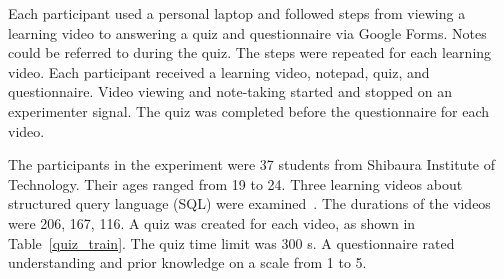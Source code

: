 %
Each participant used a personal laptop and followed steps from viewing a learning video to answering a quiz and questionnaire via Google Forms.
Notes could be referred to during the quiz.
The steps were repeated for each learning video.
Each participant received a learning video, notepad, quiz, and questionnaire.
Video viewing and note-taking started and stopped on an experimenter signal.
The quiz was completed before the questionnaire for each video.

%
The participants in the experiment were 37 students from Shibaura Institute of Technology.
  Their ages ranged from 19 to 24.
%
Three learning videos about structured query language (SQL) were examined~\cite{SQL}.
%
The durations of the videos were 206, 167, 116.
%
A quiz was created for each video, as shown in Table~\ref{quiz_train}.
  The quiz time limit was 300 s.
  A questionnaire rated understanding and prior knowledge on a scale from 1 to 5.
